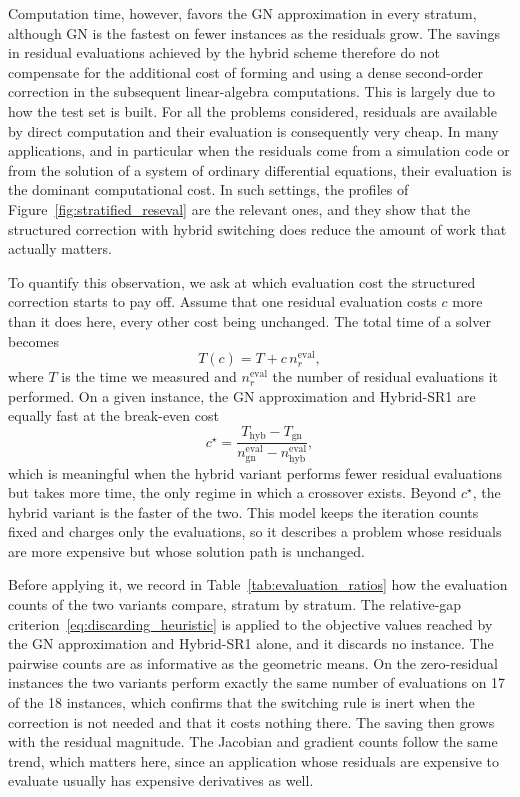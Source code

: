 \documentclass[pdflatex,sn-mathphys-num]{sn-jnl}%
\theoremstyle{thmstyleone}%
\begin{document}
Computation time, however, favors the GN approximation in every stratum, although GN is the fastest on fewer instances as the residuals grow. The savings in residual evaluations achieved by the hybrid scheme therefore do not compensate for the additional cost of forming and using a dense second-order correction in the subsequent linear-algebra computations. This is largely due to how the test set is built. For all the problems considered, residuals are available by direct computation and their evaluation is consequently very cheap. In many applications, and in particular when the residuals come from a simulation code or from the solution of a system of ordinary differential equations, their evaluation is the dominant computational cost. In such settings, the profiles of Figure~\ref{fig:stratified_reseval} are the relevant ones, and they show that the structured correction with hybrid switching does reduce the amount of work that actually matters. 

To quantify this observation, we ask at which evaluation cost the structured correction starts to pay off. Assume that one residual evaluation costs $c$ more than it does here, every other cost being unchanged. The total time of a solver becomes
\begin{equation}\label{eq:residual_cost_model}
	T(c) = T + c\, n_r^{\mathrm{eval}},
\end{equation}
where $T$ is the time we measured and $n_r^{\mathrm{eval}}$ the number of residual evaluations it performed. On a given instance, the GN approximation and Hybrid-SR1 are equally fast at the break-even cost
\begin{equation}\label{eq:breakeven_cost}
	c^\star = \dfrac{T_{\mathrm{hyb}}-T_{\mathrm{gn}}}{n^{\mathrm{eval}}_{\mathrm{gn}}-n^{\mathrm{eval}}_{\mathrm{hyb}}},
\end{equation}
which is meaningful when the hybrid variant performs fewer residual evaluations but takes more time, the only regime in which a crossover exists. Beyond $c^\star$, the hybrid variant is the faster of the two. This model keeps the iteration counts fixed and charges only the evaluations, so it describes a problem whose residuals are more expensive but whose solution path is unchanged.

Before applying it, we record in Table~\ref{tab:evaluation_ratios} how the evaluation counts of the two variants compare, stratum by stratum. The relative-gap criterion~\eqref{eq:discarding_heuristic} is applied to the objective values reached by the GN approximation and Hybrid-SR1 alone, and it discards no instance. The pairwise counts are as informative as the geometric means. On the zero-residual instances the two variants perform exactly the same number of evaluations on 17 of the 18 instances, which confirms that the switching rule is inert when the correction is not needed and that it costs nothing there. The saving then grows with the residual magnitude. The Jacobian and gradient counts follow the same trend, which matters here, since an application whose residuals are expensive to evaluate usually has expensive derivatives as well.
\end{document}
